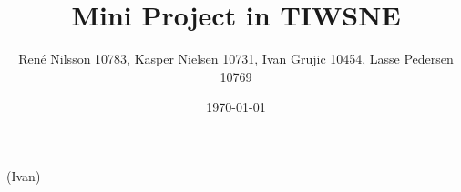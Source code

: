 \documentclass[]{report}
\begin{document}
\title{Mini Project in TIWSNE}
\author{René Nilsson 10783, Kasper Nielsen 10731, Ivan Grujic 10454, Lasse Pedersen 10769}

\date{\today}
\maketitle
{}

\tableofcontents



 (Ivan)














\end{document}
